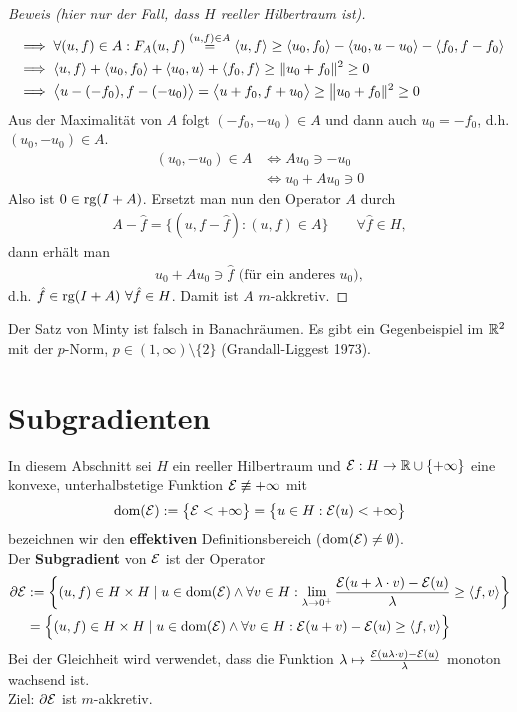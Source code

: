 \begin{proof}[Beweis (hier nur der Fall, dass $H$ reeller Hilbertraum ist)]
\begin{align*}
&\implies
\forall(u,f)\in A:
F_A(u,f)\stackrel{(u,f)\in A}{=}\langle u,f\rangle\geq\langle u_0,f_0\rangle-\langle u_0,u-u_0\rangle-\langle f_0,f-f_0\rangle\\
&\implies
\langle u,f\rangle +\langle u_0,f_0\rangle+\langle u_0,u\rangle+\langle f_0,f\rangle\geq\Vert u_0+f_0\Vert^2\geq0\\
&\implies
\big\langle u-(-f_0),f-(-u_0)\big\rangle=
\big\langle u+f_0,f+u_0\big\rangle\geq\big\Vert u_0+f_0\Vert^2\geq0
\end{align*}
Aus der Maximalität von $A$ folgt $(-f_0,-u_0)\in A$ und dann auch $u_0=-f_0$, d.h.\\ $(u_0,-u_0)\in A$.
\begin{align*}
(u_0,-u_0)\in A
&\Longleftrightarrow Au_0\ni -u_0\\
&\Longleftrightarrow u_0+Au_0\ni 0
\end{align*}
Also ist $0\in\text{rg}(I+A)$. Ersetzt man nun den Operator $A$ durch
\begin{align*}
A-\hat{f}=\big\lbrace(u,f-\hat{f}):(u,f)\in A\big\rbrace\qquad\forall \hat{f}\in H,
\end{align*}
dann erhält man
\begin{align*}
u_0+Au_0\ni\hat{f}\text{ (für ein anderes $u_0$)},
\end{align*}
d.h. $\hat{f}\in\text{rg}(I+A)~\forall\hat{f}\in H$. Damit ist $A$ $m$-akkretiv.
\end{proof}

\begin{bemerkung}
Der Satz von Minty ist falsch in Banachräumen. Es gibt ein Gegenbeispiel im $\mathbb{R}^2$ mit der $p$-Norm, $p\in(1,\infty)\setminus\lbrace2\rbrace$ (Grandall-Liggest 1973).
\end{bemerkung}

\section{Subgradienten}
In diesem Abschnitt sei $H$ ein reeller Hilbertraum und $\mathcal{E}:H\to\mathbb{R}\cup\lbrace+\infty\rbrace$ eine konvexe, unterhalbstetige Funktion $\mathcal{E}\not\equiv+\infty$ mit
\begin{align*}
\text{dom}(\mathcal{E}):=\big\lbrace\mathcal{E}<+\infty\big\rbrace=\big\lbrace u\in H:\mathcal{E}(u)<+\infty\big\rbrace
\end{align*}
bezeichnen wir den \textbf{effektiven} Definitionsbereich ($\text{dom}(\mathcal{E})\neq\emptyset$).\\
Der \textbf{Subgradient} von $\mathcal{E}$ ist der Operator
\begin{align*}
\partial\mathcal{E}&:=\left\lbrace (u,f)\in H\times H\mid u\in\text{dom}(\mathcal{E})\wedge\forall v\in H:\lim\limits_{\lambda\to0^+}\frac{\mathcal{E}(u+\lambda\cdot v)-\mathcal{E}(u)}{\lambda}\geq\langle f,v\rangle\right\rbrace\\
&=\Big\lbrace(u,f)\in H\times H\mid u\in\text{dom}(\mathcal{E})\wedge\forall v\in H:\mathcal{E}(u+v)-\mathcal{E}(u)\geq\langle f,v\rangle\Big\rbrace
\end{align*}
Bei der Gleichheit wird verwendet, dass die Funktion $\lambda\mapsto\frac{\mathcal{E}(u\lambda\cdot v)-\mathcal{E}(u)}{\lambda}$ monoton wachsend ist.\\
Ziel: $\partial\mathcal{E}$ ist $m$-akkretiv.


